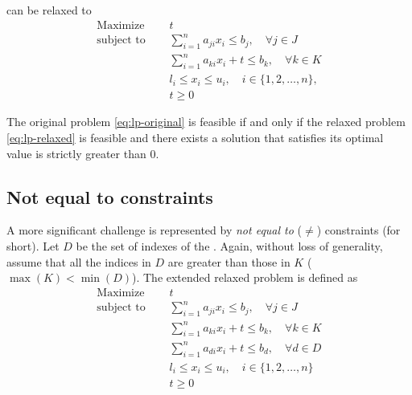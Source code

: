 \documentclass[runningheads]{llncs}
\begin{document}
can be relaxed to
\begin{equation}
    \label{eq:lp-relaxed}
    \begin{split}
        \text{Maximize }   \quad & t                                                             \\
        \text{subject to } \quad & \sum_{i=1}^{n} a_{ji}x_{i} \le b_j, \quad \forall j \in J     \\
        \quad                    & \sum_{i=1}^{n} a_{ki}x_{i} + t \le b_k, \quad \forall k \in K \\
        & l_i \le x_i \le u_i,  \quad i \in \{1, 2, \ldots, n\},        \\
        & t \ge 0
    \end{split}
\end{equation}

\begin{theorem}
    \label{thm:lp-relaxed}
    The original problem \eqref{eq:lp-original} is feasible if and only if the relaxed problem \eqref{eq:lp-relaxed} is feasible and there exists a solution that satisfies its optimal value is strictly greater than $0$.
\end{theorem}

\subsection{Not equal to constraints}

A more significant challenge is represented by \textit{not equal to} ($\ne$) constraints (\nqcs for short).
Let $D$ be the set of indexes of the \nqcs.
Again, without loss of generality, assume that all the indices in $D$ are greater than those in $K$ ($\max(K) < \min(D)$).
The extended relaxed problem is defined as
\begin{equation}
    \label{eq:lp-extended}
    \begin{split}
        \text{Maximize }   \quad & t                                                             \\
        \text{subject to } \quad & \sum_{i=1}^{n} a_{ji}x_{i} \le b_j, \quad \forall j \in J     \\
        \quad                    & \sum_{i=1}^{n} a_{ki}x_{i} + t \le b_k, \quad \forall k \in K \\
        \quad                    & \sum_{i=1}^{n} a_{di}x_{i} + t \le b_d, \quad \forall d \in D \\
        & l_i \le x_i \le u_i,  \quad i \in \{1, 2, \ldots, n\}         \\
        & t \ge 0
    \end{split}
\end{equation}
\end{document}
